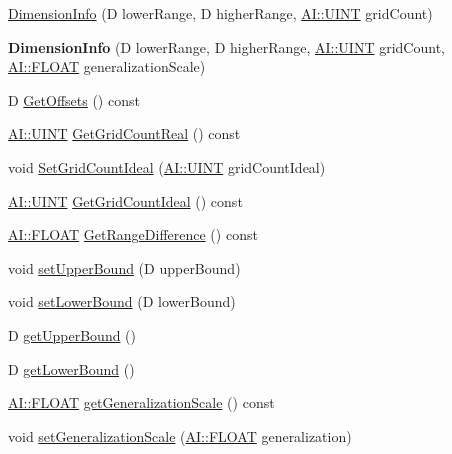 \begin{DoxyCompactItemize}
\item 
\hyperlink{classAI_1_1Algorithm_1_1DimensionInfo_a81474f419c3763f3de2833c8edb378c4}{Dimension\-Info} (D lower\-Range, D higher\-Range, \hyperlink{namespaceAI_ab6e14dc1e659854858a87e511f1439ec}{A\-I\-::\-U\-I\-N\-T} grid\-Count)
\item 
\hypertarget{classAI_1_1Algorithm_1_1DimensionInfo_a1401520e0bfb6e50b064ab0d94b8d5ec}{{\bfseries Dimension\-Info} (D lower\-Range, D higher\-Range, \hyperlink{namespaceAI_ab6e14dc1e659854858a87e511f1439ec}{A\-I\-::\-U\-I\-N\-T} grid\-Count, \hyperlink{namespaceAI_a41b74884a20833db653dded3918e05c3}{A\-I\-::\-F\-L\-O\-A\-T} generalization\-Scale)}\label{classAI_1_1Algorithm_1_1DimensionInfo_a1401520e0bfb6e50b064ab0d94b8d5ec}

\item 
D \hyperlink{classAI_1_1Algorithm_1_1DimensionInfo_a20db996bd27cf32c94fa1365546bde98}{Get\-Offsets} () const 
\item 
\hyperlink{namespaceAI_ab6e14dc1e659854858a87e511f1439ec}{A\-I\-::\-U\-I\-N\-T} \hyperlink{classAI_1_1Algorithm_1_1DimensionInfo_a06b80f631364311d2e731ea6646a2232}{Get\-Grid\-Count\-Real} () const 
\item 
void \hyperlink{classAI_1_1Algorithm_1_1DimensionInfo_a44578552f80f0772396bdc0430059e9e}{Set\-Grid\-Count\-Ideal} (\hyperlink{namespaceAI_ab6e14dc1e659854858a87e511f1439ec}{A\-I\-::\-U\-I\-N\-T} grid\-Count\-Ideal)
\item 
\hyperlink{namespaceAI_ab6e14dc1e659854858a87e511f1439ec}{A\-I\-::\-U\-I\-N\-T} \hyperlink{classAI_1_1Algorithm_1_1DimensionInfo_a6f6590d1d331c55ff424196a16232d94}{Get\-Grid\-Count\-Ideal} () const 
\item 
\hyperlink{namespaceAI_a41b74884a20833db653dded3918e05c3}{A\-I\-::\-F\-L\-O\-A\-T} \hyperlink{classAI_1_1Algorithm_1_1DimensionInfo_ac00dab53a32a43aca17dcb48d8109436}{Get\-Range\-Difference} () const 
\item 
void \hyperlink{classAI_1_1Algorithm_1_1DimensionInfo_a9889cad59dddd038f7fbddbd2ac6ece4}{set\-Upper\-Bound} (D upper\-Bound)
\item 
void \hyperlink{classAI_1_1Algorithm_1_1DimensionInfo_adef1b2721242ef4ca4978a1ceb8d2474}{set\-Lower\-Bound} (D lower\-Bound)
\item 
D \hyperlink{classAI_1_1Algorithm_1_1DimensionInfo_a01eab7ae14a0653b6042afc93ec988c5}{get\-Upper\-Bound} ()
\item 
D \hyperlink{classAI_1_1Algorithm_1_1DimensionInfo_a21bdf660f342425445db64a1dea1fc2f}{get\-Lower\-Bound} ()
\item 
\hyperlink{namespaceAI_a41b74884a20833db653dded3918e05c3}{A\-I\-::\-F\-L\-O\-A\-T} \hyperlink{classAI_1_1Algorithm_1_1DimensionInfo_a82de90c2830def513911e4a3135ac2e2}{get\-Generalization\-Scale} () const 
\item 
void \hyperlink{classAI_1_1Algorithm_1_1DimensionInfo_a53462f78d4d95d27ccb421f519b3112a}{set\-Generalization\-Scale} (\hyperlink{namespaceAI_a41b74884a20833db653dded3918e05c3}{A\-I\-::\-F\-L\-O\-A\-T} generalization)
\end{DoxyCompactItemize}


